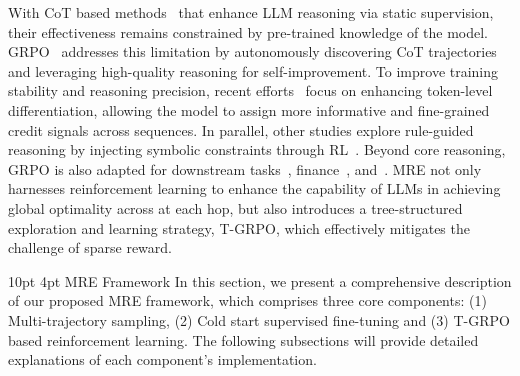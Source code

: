 \documentclass[letterpaper]{article} %
\makeatletter
\renewcommand{\section}{%
  \@startsection{section}{1}{\z@}%
  {10pt} %
  {4pt}  %
  {\centering\bfseries\large}%
}
\makeatother
\begin{document}
With CoT based methods~\cite{wei2022chain,yao2023tree,jin-etal-2024-graph,ma2022searching,song2022improving} that enhance LLM reasoning via static supervision, their effectiveness remains constrained by pre-trained knowledge of the model. GRPO~\cite{guo2025deepseek,liu2025structural} addresses this limitation by autonomously discovering CoT trajectories and leveraging high-quality reasoning for self-improvement. To improve training stability and reasoning precision, recent efforts~\cite{yu2025dapo,zheng2025group,xue2024question,wang2025not} focus on enhancing token-level differentiation, allowing the model to assign more informative and fine-grained credit signals across sequences. In parallel, other studies explore rule-guided reasoning by injecting symbolic constraints through RL~\cite{fang2025thinkless,jiang2025think,liu2024resolving,ma2025reasoning,wu2025progressive}. Beyond core reasoning, GRPO is also adapted for downstream tasks~\cite{chen2025rm,wu2025unleashing,liu2025inference}, finance~\cite{liu2025fin,zhu2025dianjin,xue2023dual,li2024comateformer}, and~\cite{lai2025med,li2024local,liu2025stole}. MRE not only harnesses reinforcement learning to enhance the capability of LLMs in achieving global optimality across at each hop, but also introduces a tree-structured exploration and learning strategy, T-GRPO, which effectively mitigates the challenge of sparse reward.



\section{MRE Framework}
In this section, we present a comprehensive description of our proposed MRE framework, which comprises three core components: (1) Multi-trajectory sampling, (2) Cold start supervised fine-tuning and (3) T-GRPO based reinforcement learning. The following subsections will provide detailed explanations of each component's implementation.
\end{document}
